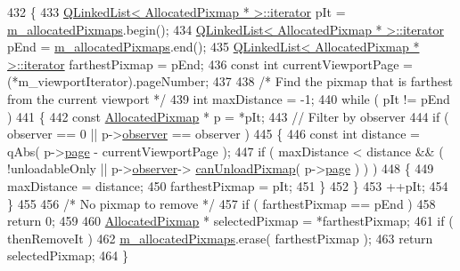 \begin{DoxyCode}
432 \{
433     \hyperlink{classQLinkedList}{QLinkedList< AllocatedPixmap * >::iterator} pIt = 
      \hyperlink{classOkular_1_1DocumentPrivate_a13e55dcfc91cfbe1ff91a55312f3e39f}{m\_allocatedPixmaps}.begin();
434     \hyperlink{classQLinkedList}{QLinkedList< AllocatedPixmap * >::iterator} pEnd = 
      \hyperlink{classOkular_1_1DocumentPrivate_a13e55dcfc91cfbe1ff91a55312f3e39f}{m\_allocatedPixmaps}.end();
435     \hyperlink{classQLinkedList}{QLinkedList< AllocatedPixmap * >::iterator} farthestPixmap = 
      pEnd;
436     \textcolor{keyword}{const} \textcolor{keywordtype}{int} currentViewportPage = (*m\_viewportIterator).pageNumber;
437 
438     \textcolor{comment}{/* Find the pixmap that is farthest from the current viewport */}
439     \textcolor{keywordtype}{int} maxDistance = -1;
440     \textcolor{keywordflow}{while} ( pIt != pEnd )
441     \{
442         \textcolor{keyword}{const} \hyperlink{structAllocatedPixmap}{AllocatedPixmap} * p = *pIt;
443         \textcolor{comment}{// Filter by observer}
444         \textcolor{keywordflow}{if} ( observer == 0 || p->\hyperlink{structAllocatedPixmap_a5ee1fe9a6b1a37583c0ea54045cc7800}{observer} == observer )
445         \{
446             \textcolor{keyword}{const} \textcolor{keywordtype}{int} distance = qAbs( p->\hyperlink{structAllocatedPixmap_a197c0639216aa0819deb72fd8705d115}{page} - currentViewportPage );
447             \textcolor{keywordflow}{if} ( maxDistance < distance && ( !unloadableOnly || p->\hyperlink{structAllocatedPixmap_a5ee1fe9a6b1a37583c0ea54045cc7800}{observer}->
      \hyperlink{classOkular_1_1DocumentObserver_a6b294d9207a1546eb9fcb7b878d94f20}{canUnloadPixmap}( p->\hyperlink{structAllocatedPixmap_a197c0639216aa0819deb72fd8705d115}{page} ) ) )
448             \{
449                 maxDistance = distance;
450                 farthestPixmap = pIt;
451             \}
452         \}
453         ++pIt;
454     \}
455 
456     \textcolor{comment}{/* No pixmap to remove */}
457     \textcolor{keywordflow}{if} ( farthestPixmap == pEnd )
458         \textcolor{keywordflow}{return} 0;
459 
460     \hyperlink{structAllocatedPixmap}{AllocatedPixmap} * selectedPixmap = *farthestPixmap;
461     \textcolor{keywordflow}{if} ( thenRemoveIt )
462         \hyperlink{classOkular_1_1DocumentPrivate_a13e55dcfc91cfbe1ff91a55312f3e39f}{m\_allocatedPixmaps}.erase( farthestPixmap );
463     \textcolor{keywordflow}{return} selectedPixmap;
464 \}
\end{DoxyCode}
